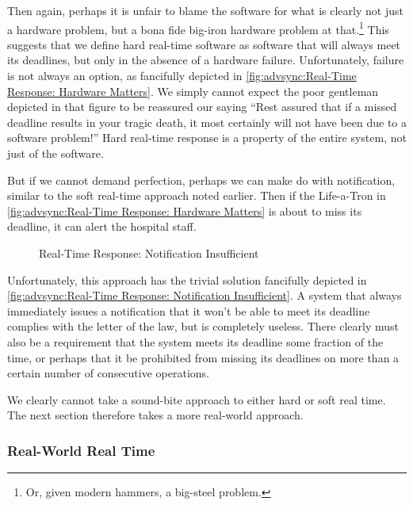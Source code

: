 Then again, perhaps it is unfair to blame the software for what is clearly
not just a hardware problem, but a bona fide big-iron hardware problem
at that.\footnote{
	Or, given modern hammers, a big-steel problem.}
This suggests that we define hard real-time software as software that
will always meet its deadlines, but only in the absence of a hardware
failure.
Unfortunately, failure is not always an option, as fancifully depicted in
\cref{fig:advsync:Real-Time Response: Hardware Matters}.
We simply cannot expect the poor gentleman depicted in that figure to be
reassured our saying ``Rest assured that if a missed deadline results
in your tragic death, it most certainly will not have been due to a
software problem!''
Hard real-time response is a property of the entire system, not
just of the software.

But if we cannot demand perfection, perhaps we can make do with
notification, similar to the soft real-time approach noted earlier.
Then if the Life-a-Tron in
\cref{fig:advsync:Real-Time Response: Hardware Matters}
is about to miss its deadline,
it can alert the hospital staff.

\begin{figure}
\centering
{}
\caption{Real-Time Response: Notification Insufficient}
\end{figure}

Unfortunately, this approach has the trivial solution fancifully depicted in
\cref{fig:advsync:Real-Time Response: Notification Insufficient}.
A system that always immediately issues a notification that it won't
be able to meet its deadline complies with the letter of the law,
but is completely useless.
There clearly must also be a requirement that the system meets its deadline
some fraction of the time, or perhaps that it be prohibited from missing
its deadlines on more than a certain number of consecutive operations.

We clearly cannot take a sound-bite approach to either hard or soft
real time.
The next section therefore takes a more real-world approach.

\subsubsection{Real-World Real Time}
\label{sec:advsync:Real-World Real Time}

